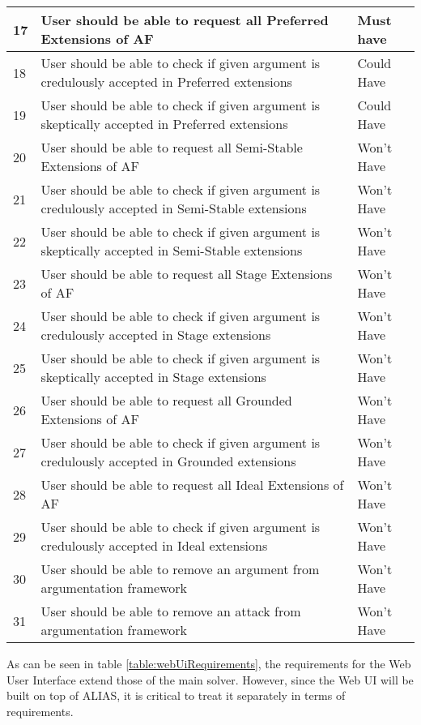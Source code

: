 \begin{longtable}[c]{|p{0.5cm}|p{10cm}|p{2.5cm}|}
	17 & User should be able to request all Preferred Extensions of AF & Must have \\ \hline
	18 & User should be able to check if given argument is credulously accepted in Preferred extensions & Could Have \\ \hline
	19 & User should be able to check if given argument is skeptically accepted in Preferred extensions & Could Have \\ \hline
	20 & User should be able to request all Semi-Stable Extensions of AF & Won't Have \\ \hline
	21 & User should be able to check if given argument is credulously accepted in Semi-Stable extensions & Won't Have \\ \hline
	22 & User should be able to check if given argument is skeptically accepted in Semi-Stable extensions & Won't Have \\ \hline
	23 & User should be able to request all Stage Extensions of AF & Won't Have \\ \hline
	24 & User should be able to check if given argument is credulously accepted in Stage extensions & Won't Have \\ \hline
	25 & User should be able to check if given argument is skeptically accepted in Stage extensions & Won't Have \\ \hline
	26 & User should be able to request all Grounded Extensions of AF & Won't Have \\ \hline
	27 & User should be able to check if given argument is credulously accepted in Grounded extensions & Won't Have \\ \hline
	28 & User should be able to request all Ideal Extensions of AF & Won't Have \\ \hline
	29 & User should be able to check if given argument is credulously accepted in Ideal extensions & Won't Have \\ \hline	
	30 & User should be able to remove an argument from argumentation framework & Won't Have \\ \hline
	31 & User should be able to remove an attack from argumentation framework & Won't Have \\ \hline
\end{longtable}

As can be seen in table \ref{table:webUiRequirements}, the requirements for the Web User Interface extend those of the main solver. However, since the Web UI will be built on top of ALIAS, it is critical to treat it separately in terms of requirements. 


